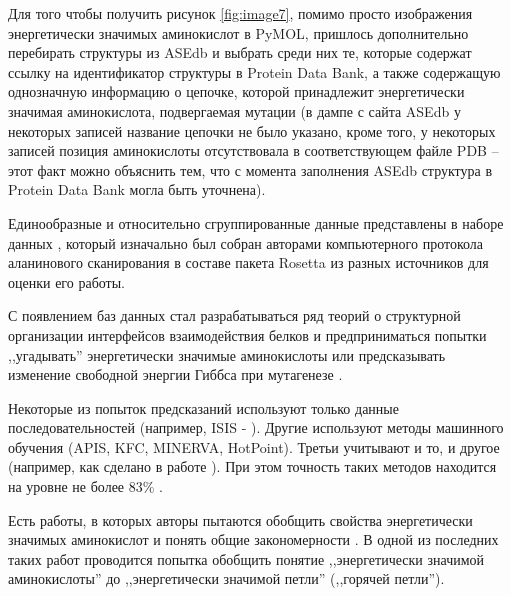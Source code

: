 Для того чтобы получить рисунок \ref{fig:image7}, помимо просто изображения энергетически значимых аминокислот в PyMOL, пришлось дополнительно перебирать структуры из ASEdb и выбрать среди них те, которые содержат ссылку на идентификатор структуры в Protein Data Bank, а также содержащую однозначную информацию о цепочке, которой принадлежит энергетически значимая аминокислота, подвергаемая мутации (в дампе с сайта ASEdb у некоторых записей название цепочки не было указано, кроме того, у некоторых записей позиция аминокислоты отсутствовала в соответствующем файле PDB -- этот факт можно объяснить тем, что с момента заполнения ASEdb структура в Protein Data Bank могла быть уточнена).

Единообразные и относительно сгруппированные данные представлены в наборе данных  \cite{kortemme_alascan_datasets}, который изначально был собран авторами компьютерного протокола аланинового сканирования в составе пакета Rosetta \cite{kortemme2002, kortemme2004} из разных источников для оценки его работы.

С появлением баз данных стал разрабатываться ряд теорий о структурной организации интерфейсов взаимодействия белков и предприниматься попытки ,,угадывать'' энергетически значимые аминокислоты или предсказывать изменение свободной энергии Гиббса при мутагенезе \cite{rev2}.

Некоторые из попыток предсказаний используют только данные последовательностей (например, ISIS - 
\cite{very_good}). Другие используют методы машинного обучения (APIS, KFC, MINERVA, HotPoint). Третьи учитывают и то, и другое (например, как сделано в работе \cite{hmmsvm}). При этом точность таких методов находится на уровне не более 83\% \cite{art2014,water}.


Есть  работы, в которых авторы пытаются обобщить свойства энергетически значимых аминокислот и понять общие закономерности \cite{pockets2004, orings, loops2014}. В одной из последних таких работ \cite{loops2014} проводится попытка обобщить понятие ,,энергетически значимой аминокислоты'' до ,,энергетически значимой петли'' (,,горячей петли'').

%


